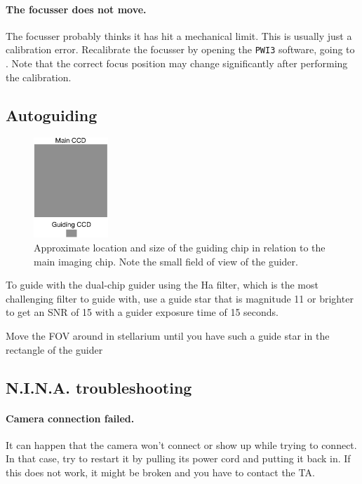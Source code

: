 \documentclass[a4paper, 11pt, fleqn]{memoir}
\begin{document}
\paragraph*{The focusser does not move.}
The focusser probably thinks it has hit a mechanical limit.
This is usually just a calibration error.
Recalibrate the focusser by opening the \texttt{PWI3} software, going to .
Note that the correct focus position may change significantly after performing the calibration.

\subsection{Autoguiding}

\begin{figure}
    \centering
    \includegraphics[width=0.25\textwidth]{guiding-chip-position}
    \caption{Approximate location and size of the guiding chip in relation to the main imaging chip.
        Note the small field of view of the guider.
    }
    \label{finder}
\end{figure}


To guide with the dual-chip guider using the Ha filter, which is the most challenging filter to guide with, use a guide star that is magnitude 11 or brighter to get an SNR of 15 with a guider exposure time of 15 seconds.

Move the FOV around in stellarium until you have such a guide star in the rectangle of the guider


\subsection{N.I.N.A. troubleshooting}

\paragraph*{Camera connection failed.} It can happen that the camera won't connect or show up while trying to connect. In that case, try to restart it by pulling its power cord and putting it back in. If this does not work, it might be broken and you have to contact the TA.
\end{document}
